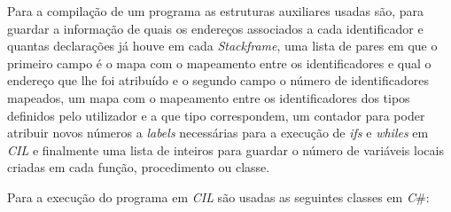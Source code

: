 Para a compilação de um programa as estruturas auxiliares usadas são, para guardar a informação de quais os endereços associados a cada identificador e quantas declarações já houve em cada \emph{Stackframe}, uma lista de pares em que o primeiro campo é o mapa com o mapeamento entre os identificadores e qual o endereço que lhe foi atribuído e o segundo campo o número de identificadores mapeados, um mapa com o mapeamento entre os identificadores dos tipos definidos pelo utilizador e a que tipo correspondem, um contador para poder atribuir novos números a \emph{labels} necessárias para a execução de \emph{ifs} e \emph{whiles} em \emph{CIL} e finalmente uma lista de inteiros para guardar o número de variáveis locais criadas em cada função, procedimento ou classe.

Para a execução do programa em \emph{CIL} são usadas as seguintes classes em \emph{C}\#:\\


